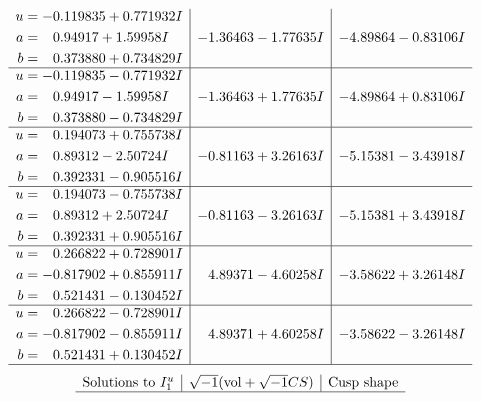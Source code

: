 \documentclass[1p]{elsarticle_modified}
\theoremstyle{definition}
\newcommand{\I}{\sqrt{-1}}
\begin{document}
$$\begin{array}{c|c|c}
\begin{aligned}
u &= -0.119835 + 0.771932 I \\
a &= \phantom{-}0.94917 + 1.59958 I \\
b &= \phantom{-}0.373880 + 0.734829 I\end{aligned}
 & -1.36463 - 1.77635 I & -4.89864 - 0.83106 I \\ \hline\begin{aligned}
u &= -0.119835 - 0.771932 I \\
a &= \phantom{-}0.94917 - 1.59958 I \\
b &= \phantom{-}0.373880 - 0.734829 I\end{aligned}
 & -1.36463 + 1.77635 I & -4.89864 + 0.83106 I \\ \hline\begin{aligned}
u &= \phantom{-}0.194073 + 0.755738 I \\
a &= \phantom{-}0.89312 - 2.50724 I \\
b &= \phantom{-}0.392331 - 0.905516 I\end{aligned}
 & -0.81163 + 3.26163 I & -5.15381 - 3.43918 I \\ \hline\begin{aligned}
u &= \phantom{-}0.194073 - 0.755738 I \\
a &= \phantom{-}0.89312 + 2.50724 I \\
b &= \phantom{-}0.392331 + 0.905516 I\end{aligned}
 & -0.81163 - 3.26163 I & -5.15381 + 3.43918 I \\ \hline\begin{aligned}
u &= \phantom{-}0.266822 + 0.728901 I \\
a &= -0.817902 + 0.855911 I \\
b &= \phantom{-}0.521431 - 0.130452 I\end{aligned}
 & \phantom{-}4.89371 - 4.60258 I & -3.58622 + 3.26148 I \\ \hline\begin{aligned}
u &= \phantom{-}0.266822 - 0.728901 I \\
a &= -0.817902 - 0.855911 I \\
b &= \phantom{-}0.521431 + 0.130452 I\end{aligned}
 & \phantom{-}4.89371 + 4.60258 I & -3.58622 - 3.26148 I\\
 \hline 
 \end{array}$$\newpage$$\begin{array}{c|c|c}  
\text{Solutions to }I^u_{1}& \I (\text{vol} + \sqrt{-1}CS) & \text{Cusp shape}\\
 \hline 

\end{array}$$
\end{document}
